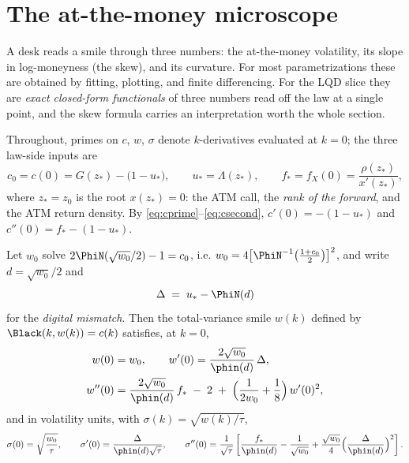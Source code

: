 \section{The at-the-money microscope}
\label{sec:atm}

A desk reads a smile through three numbers: the at-the-money volatility,
its slope in log-moneyness (the skew), and its curvature.  For most
parametrizations these are obtained by fitting, plotting, and finite
differencing.  For the LQD slice they are \emph{exact closed-form
functionals} of three numbers read off the law at a single point, and the
skew formula carries an interpretation worth the whole section.

Throughout, primes on $c$, $w$, $\sigma$ denote $k$-derivatives evaluated
at $k=0$; the three law-side inputs are
\begin{equation}
c_0=c(0)=G(z_*)-\big(1-u_*\big),
\qquad
u_*=\Lambda(z_*),
\qquad
f_*=f_X(0)=\frac{\rho(z_*)}{x'(z_*)},
\label{eq:atm_inputs}
\end{equation}
where $z_*=z_0$ is the root $x(z_*)=0$: the ATM call, the \emph{rank of
the forward}, and the ATM return density.  By
\eqref{eq:cprime}--\eqref{eq:csecond}, $c'(0)=-(1-u_*)$ and
$c''(0)=f_*-(1-u_*)$.

\begin{proposition}
\label{prop:atm}
Let $w_0$ solve $2\PhiN(\sqrt{w_0}/2)-1=c_0$, i.e.
$w_0=4\big[\PhiN^{-1}\big(\tfrac{1+c_0}{2}\big)\big]^{2}$, and write
$d=\sqrt{w_0}/2$ and
\begin{equation}
\Delta\;=\;u_*-\PhiN(d)
\label{eq:digitalgap}
\end{equation}
for the \emph{digital mismatch}.  Then the total-variance smile $w(k)$
defined by $\Black(k,w(k))=c(k)$ satisfies, at $k=0$,
\begin{align}
w(0)&=w_0,
\qquad
w'(0)=\frac{2\sqrt{w_0}}{\phin(d)}\,\Delta,
\label{eq:atm_w}\\
w''(0)&=\frac{2\sqrt{w_0}}{\phin(d)}\,f_*\;-\;2
\;+\;\Big(\frac{1}{2w_0}+\frac18\Big)\,w'(0)^{2},
\label{eq:atm_wpp}
\end{align}
and in volatility units, with $\sigma(k)=\sqrt{w(k)/\tau}$,
\begin{equation}
\sigma(0)=\sqrt{\frac{w_0}{\tau}},
\qquad
\sigma'(0)=\frac{\Delta}{\phin(d)\sqrt{\tau}},
\qquad
\sigma''(0)=\frac{1}{\sqrt{\tau}}
\left[\frac{f_*}{\phin(d)}-\frac{1}{\sqrt{w_0}}
+\frac{\sqrt{w_0}}{4}\Big(\frac{\Delta}{\phin(d)}\Big)^{2}\right].
\label{eq:atm_sigma}
\end{equation}
\end{proposition}

